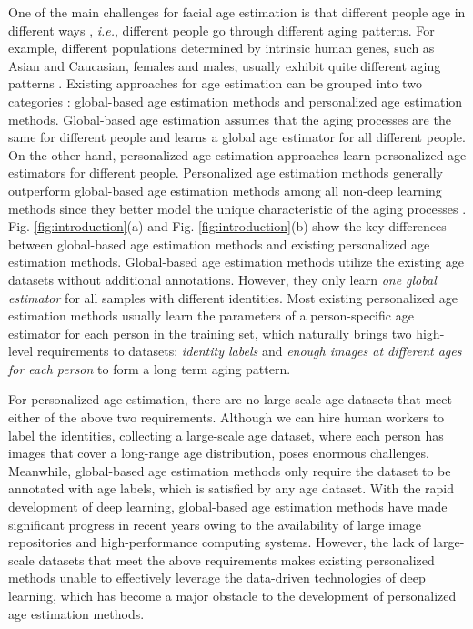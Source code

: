 \documentclass[journal,twoside]{IEEEtran}
\begin{document}
One of the main challenges for facial age estimation is that different people age in different ways \cite{geng2007automatic}, \emph{i.e.}, different people go through different aging patterns. For example, different populations determined by intrinsic human genes, such as Asian and Caucasian, females and males, usually exhibit quite different aging patterns \cite{li2018deep}. Existing approaches for age estimation can be grouped into two categories \cite{zhang2010multi}: global-based age estimation methods and personalized age estimation methods. Global-based age estimation assumes that the aging processes are the same for different people and learns a global age estimator for all different people. On the other hand, personalized age estimation approaches learn personalized age estimators for different people. Personalized age estimation methods generally outperform global-based age estimation methods among all non-deep learning methods since they better model the unique characteristic of the aging processes \cite{zhang2010multi}.
Fig. \ref{fig:introduction}(a) and Fig. \ref{fig:introduction}(b) show the key differences between global-based age estimation methods and existing personalized age estimation methods.  Global-based age estimation methods utilize the existing age datasets without additional annotations. However, they only learn \emph{one global estimator} for all samples with different identities. 
Most existing personalized age estimation methods \cite{zhang2010multi,lanitis2002toward} usually learn the parameters of a person-specific age estimator for each person in the training set, which naturally brings two  high-level requirements to datasets:  \emph{identity labels} and \emph{enough images at different ages for each person} to form a long term aging pattern. 





For personalized age estimation, there are no large-scale age datasets that meet either of the above two requirements.
Although we can hire human workers to label the identities, collecting a large-scale age dataset, where each person has images that cover a long-range age distribution, poses enormous challenges.
Meanwhile, global-based age estimation methods only require the dataset to be annotated with age labels, which is satisfied by any age dataset. With the rapid development of deep learning, global-based age estimation methods have made significant progress  \cite{pan2018mean,shen2018deep,li2019bridgenet} in recent years owing to the availability of large image repositories and high-performance computing systems. However, the lack of large-scale datasets that meet the above requirements makes existing personalized methods unable to effectively leverage the data-driven technologies of deep learning, which has become a major obstacle to the development of personalized age estimation methods.
\end{document}
